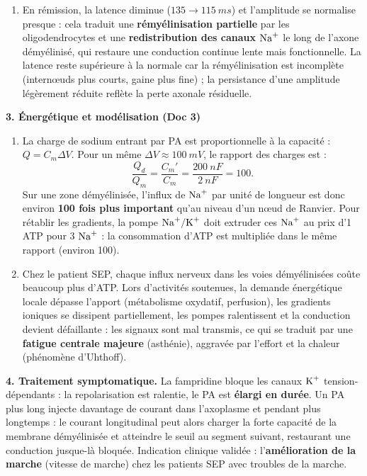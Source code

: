 \documentclass[11pt]{article}
\begin{document}
\begin{corrige}
\begin{enumerate}
    \item[c)] En rémission, la latence diminue ($135 \to \SI{115}{ms}$) et l'amplitude se normalise presque : cela traduit une \textbf{rémyélinisation partielle} par les oligodendrocytes et une \textbf{redistribution des canaux $\ce{Na+}$} le long de l'axone démyélinisé, qui restaure une conduction continue lente mais fonctionnelle. La latence reste supérieure à la normale car la rémyélinisation est incomplète (internœuds plus courts, gaine plus fine) ; la persistance d'une amplitude légèrement réduite reflète la perte axonale résiduelle.
\end{enumerate}
\textbf{3. Énergétique et modélisation (Doc 3)}
\begin{enumerate}
    \item[a)] La charge de sodium entrant par PA est proportionnelle à la capacité : $Q = C_m \Delta V$. Pour un même $\Delta V \approx \SI{100}{mV}$, le rapport des charges est :
    \[ \frac{Q_d}{Q_m} = \frac{C_m'}{C_m} = \frac{\SI{200}{nF}}{\SI{2}{nF}} = 100. \]
    Sur une zone démyélinisée, l'influx de $\ce{Na+}$ par unité de longueur est donc environ \textbf{100 fois plus important} qu'au niveau d'un nœud de Ranvier. Pour rétablir les gradients, la pompe $\ce{Na+/K+}$ doit extruder ces $\ce{Na+}$ au prix d'1 ATP pour 3 $\ce{Na+}$ : la consommation d'ATP est multipliée dans le même rapport (environ 100).
    \item[b)] Chez le patient SEP, chaque influx nerveux dans les voies démyélinisées coûte beaucoup plus d'ATP. Lors d'activités soutenues, la demande énergétique locale dépasse l'apport (métabolisme oxydatif, perfusion), les gradients ioniques se dissipent partiellement, les pompes ralentissent et la conduction devient défaillante : les signaux sont mal transmis, ce qui se traduit par une \textbf{fatigue centrale majeure} (asthénie), aggravée par l'effort et la chaleur (phénomène d'Uhthoff).
\end{enumerate}
\textbf{4. Traitement symptomatique.} La fampridine bloque les canaux $\ce{K+}$ tension-dépendants : la repolarisation est ralentie, le PA est \textbf{élargi en durée}. Un PA plus long injecte davantage de courant dans l'axoplasme et pendant plus longtemps : le courant longitudinal peut alors charger la forte capacité de la membrane démyélinisée et atteindre le seuil au segment suivant, restaurant une conduction jusque-là bloquée. Indication clinique validée : l'\textbf{amélioration de la marche} (vitesse de marche) chez les patients SEP avec troubles de la marche.


\end{corrige}
\end{document}
